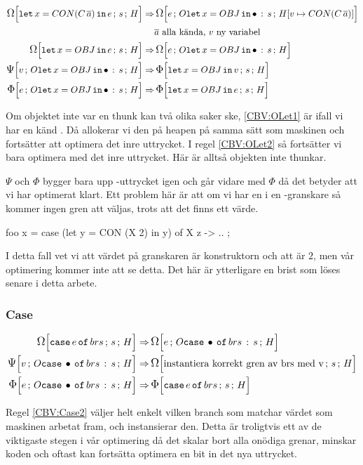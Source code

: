 \documentclass[../Optimise]{subfiles}
\begin{document}
\begin{align}
\label{CBV:OLet1} \OMEGA sH{\eLet x{\CON{C}{\many{a}}}{e}}  \Rightarrow &\, \OMEGA{\oLetObj x{OBJ}s}{\heap{v}{\CON{C}{\many{a}}}}e\\
 & \many{a} \text{ alla kända, } v \text{ ny variabel} \nonumber \\
\label{CBV:OLet2}\OMEGA sH{\eLet x{OBJ}{e}}  \Rightarrow &\, \OMEGA{\oLetObj x{OBJ}s}He\\
\PSI{\oLetObj x{OBJ}s}Hv  \Rightarrow &\, \IRR sH{\eLet x{OBJ}v}\\
\IRR{\oLetObj x{OBJ}s}He  \Rightarrow &\, \IRR sH{\eLet x{OBJ}e}
\end{align}

Om objektet inte var en thunk kan två olika saker ske, \eqref{CBV:OLet1} är ifall 
vi har en känd . Då allokerar vi den på heapen på samma sätt som maskinen
och fortsätter att optimera det inre uttrycket. I regel \eqref{CBV:OLet2} så 
fortsätter vi bara optimera med det inre uttrycket. Här är alltså objekten
inte thunkar.

$\Psi$ och $\Phi$ bygger bara upp -uttrycket igen och går vidare med $\Phi$
då det betyder att vi har optimerat klart. Ett problem här är att om vi har en 
i en -granskare så kommer ingen gren att väljas, trots att det finns ett värde.

\begin{codeEx}
foo x = case (let y = CON (X 2) in y) of
    { X z -> ..
    };
\end{codeEx} 

I detta fall vet vi att värdet på granskaren är konstruktorn  och att  är $2$, men vår optimering
kommer inte att se detta. Det här är ytterligare en brist som löses senare i detta arbete.

\subsubsection{Case}
\label{cbv:case}
\begin{align}
\OMEGA sH{\eCase e{brs}} \Rightarrow &\, \OMEGA{\oCase{brs}s}He\\
\label{CBV:Case2} \PSI{\oCase{brs}s}Hv \Rightarrow &\, \OMEGA sH{\text{instantiera korrekt gren av brs med v}} \\
\label{CBV:Case3} \IRR{\oCase{brs}s}He \Rightarrow &\, \IRR sH{\eCase e brs}
\end{align}

Regel \eqref{CBV:Case2} väljer helt enkelt vilken branch som matchar
värdet som maskinen arbetat fram, och instansierar den. Detta är troligtvis ett
av de viktigaste stegen i vår optimering då det skalar bort alla onödiga 
grenar, minskar koden och oftast kan fortsätta optimera en bit in det nya uttrycket.
\end{document}
